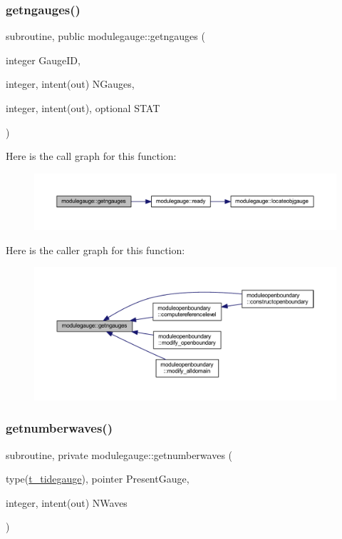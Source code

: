 \subsubsection{\texorpdfstring{getngauges()}{getngauges()}}
{\footnotesize\ttfamily subroutine, public modulegauge\+::getngauges (\begin{DoxyParamCaption}\item[{integer}]{Gauge\+ID,  }\item[{integer, intent(out)}]{N\+Gauges,  }\item[{integer, intent(out), optional}]{S\+T\+AT }\end{DoxyParamCaption})}

Here is the call graph for this function\+:\nopagebreak
\begin{figure}[H]
\begin{center}
\leavevmode
\includegraphics[width=350pt]{namespacemodulegauge_a7a4e1ac4c0d2468bf869594a8677a7d0_cgraph}
\end{center}
\end{figure}
Here is the caller graph for this function\+:\nopagebreak
\begin{figure}[H]
\begin{center}
\leavevmode
\includegraphics[width=350pt]{namespacemodulegauge_a7a4e1ac4c0d2468bf869594a8677a7d0_icgraph}
\end{center}
\end{figure}
\mbox{\label{namespacemodulegauge_a3e3b74ba912595c577820445ad14cb64}} 
\subsubsection{\texorpdfstring{getnumberwaves()}{getnumberwaves()}}
{\footnotesize\ttfamily subroutine, private modulegauge\+::getnumberwaves (\begin{DoxyParamCaption}\item[{type(\mbox{\hyperlink{structmodulegauge_1_1t__tidegauge}{t\+\_\+tidegauge}}), pointer}]{Present\+Gauge,  }\item[{integer, intent(out)}]{N\+Waves }\end{DoxyParamCaption})\hspace{0.3cm}{\ttfamily [private]}}


